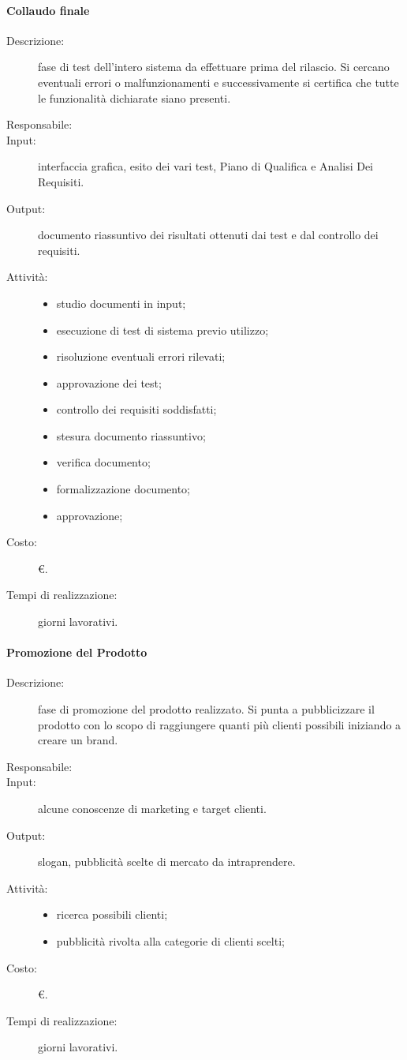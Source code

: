 \paragraph{Collaudo finale}
\begin{description}
\item[Descrizione:] fase di test dell'intero sistema da effettuare prima del rilascio. Si cercano eventuali errori o malfunzionamenti e successivamente si certifica che tutte le funzionalità dichiarate siano presenti.
\item[Responsabile:] 
\item[Input:] interfaccia grafica, esito dei vari test, Piano di Qualifica e Analisi Dei Requisiti.
\item[Output:] documento riassuntivo dei risultati ottenuti dai test e dal controllo dei requisiti.
\item[Attività:]
\begin{itemize}
\item studio documenti in input;
\item esecuzione di test di sistema previo utilizzo;
\item risoluzione eventuali errori rilevati;
\item approvazione dei test;
\item controllo dei requisiti soddisfatti;
\item stesura documento riassuntivo;
\item verifica documento;
\item formalizzazione documento;
\item approvazione;
\end{itemize}
\item[Costo:] \euro{}.
\item[Tempi di realizzazione:]  giorni lavorativi.
\end{description}

\paragraph{Promozione del Prodotto}
\begin{description}
\item[Descrizione:] fase di promozione del prodotto realizzato. Si punta a pubblicizzare il prodotto con lo scopo di raggiungere quanti più clienti possibili iniziando a creare un brand.
\item[Responsabile:] 
\item[Input:] alcune conoscenze di marketing e target clienti.
\item[Output:] slogan, pubblicità scelte di mercato da intraprendere.
\item[Attività:]
\begin{itemize}
\item ricerca possibili clienti;
\item pubblicità rivolta alla categorie di clienti scelti;
\end{itemize}
\item[Costo:] \euro{}.
\item[Tempi di realizzazione:]  giorni lavorativi.
\end{description}

